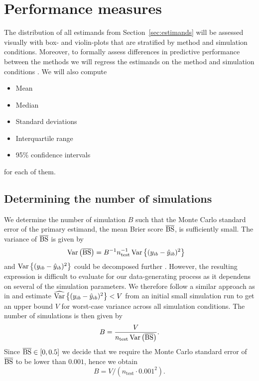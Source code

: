 \documentclass[a4paper, 11pt]{article}\usepackage[]{graphicx}\usepackage[]{color}
\begin{document}
\section{Performance measures} \label{sec:performance}

The distribution of all estimands from Section~\ref{sec:estimands} will be
assessed visually with box- and violin-plots that are stratified by method and
simulation conditions. Moreover, to formally assess differences in predictive
performance between the methods we will regress the estimands on the method
and simulation conditions \citep[\cf][]{Skrondal2000}. We will also compute
\begin{itemize}
  \item Mean
  \item Median
  \item Standard deviations
  \item Interquartile range
  \item 95\% confidence intervals
\end{itemize}
for each of them.

\subsection{Determining the number of simulations}
We determine the number of simulation $B$ such that the Monte Carlo
standard error of the primary estimand, the mean Brier score $\operatorname{\overline{BS}}$,
is sufficiently small. The variance of $\operatorname{\overline{BS}}$ is given by
\begin{align*}
  \operatorname{Var}\left(\operatorname{\overline{BS}}\right)
  &= B^{-1}n_{\text{test}}^{-1}\operatorname{Var}\left\{(y_{ib} - \hat{y}_{ib})^{2}\right\}
\end{align*}
and $\operatorname{Var}\left\{(y_{ib} - \hat{y}_{ib})^{2}\right\}$ could be decomposed
further \citep{Bradley2008}. However, the resulting expression is difficult to
evaluate for our data-generating process as it dependens on several of the
simulation parameters. We therefore follow a similar approach as in
\citet{Morris2019} and estimate
$\widehat{\operatorname{Var}}\left\{(y_{ib} - \hat{y}_{ib})^{2}\right\} < V$ from an initial
small simulation run to get an upper bound $V$ for worst-case variance across
all simulation conditions. The number of simulations is then given by
$$B = \frac{V}{n_{\text{test}} \operatorname{Var}\left(\operatorname{\overline{BS}}\right)}.$$
Since $\operatorname{\overline{BS}} \in [0, 0.5]$ we decide that we require the Monte Carlo standard
error of $\operatorname{\overline{BS}}$ to be lower than $0.001$, hence we obtain
$$B =V/(n_{\text{test}} \cdot 0.001^{2}).$$
\end{document}
